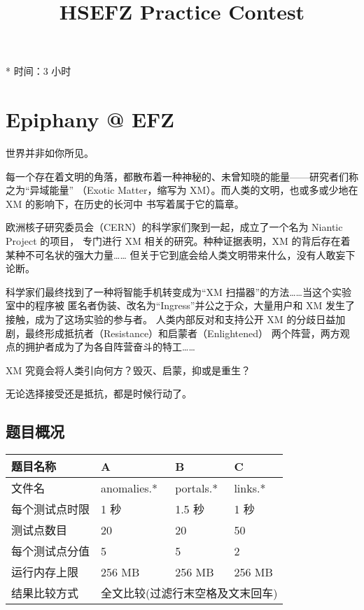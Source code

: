 \documentclass[UTF8, 11pt, a4paper]{article}
\begin{document}
\title{HSEFZ Practice Contest}
\maketitle

* 时间：3 小时
\newpage

\section*{Epiphany @ EFZ}

世界并非如你所见。

每一个存在着文明的角落，都散布着一种神秘的、未曾知晓的能量——研究者们称之为“异域能量”%
（Exotic Matter，缩写为 XM）。而人类的文明，也或多或少地在 XM 的影响下，在历史的长河中%
书写着属于它的篇章。

欧洲核子研究委员会（CERN）的科学家们聚到一起，成立了一个名为 Niantic Project 的项目，%
专门进行 XM 相关的研究。种种证据表明，XM 的背后存在着某种不可名状的强大力量……%
但关于它到底会给人类文明带来什么，没有人敢妄下论断。

科学家们最终找到了一种将智能手机转变成为“XM 扫描器”的方法……当这个实验室中的程序被%
匿名者伪装、改名为“Ingress”并公之于众，大量用户和 XM 发生了接触，成为了这场实验的参与者。%
人类内部反对和支持公开 XM 的分歧日益加剧，最终形成抵抗者（Resistance）和启蒙者（Enlightened）%
两个阵营，两方观点的拥护者成为了为各自阵营奋斗的特工……

XM 究竟会将人类引向何方？毁灭、启蒙，抑或是重生？

无论选择接受还是抵抗，都是时候行动了。
\newline\newline

\subsection*{题目概况}
\begin{tabularx}{\textwidth}{|X|X|X|X|}
\hline
题目名称 & A & B & C \\ \hline
文件名 & anomalies.* & portals.* & links.* \\ \hline
每个测试点时限 & 1 秒 & 1.5 秒 & 1 秒 \\ \hline
测试点数目 & 20 & 20 & 50 \\ \hline
每个测试点分值 & 5 & 5 & 2 \\ \hline
运行内存上限 & 256 MB & 256 MB & 256 MB \\ \hline
结果比较方式 & \multicolumn{3}{c|}{全文比较(过滤行末空格及文末回车)} \\ \hline
\end{tabularx}
\end{document}
